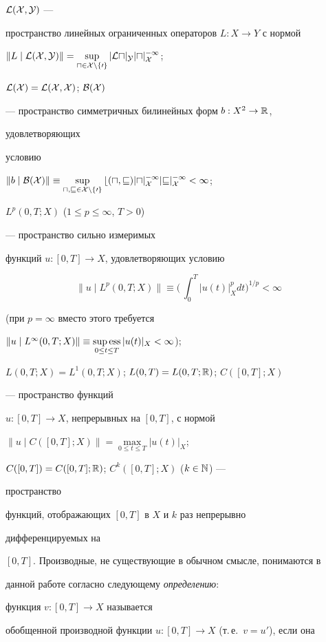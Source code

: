 $\cal L(X,Y)$ --- 


пространство линейных ограниченных операторов $L:X\to Y$ с нормой 


$\|L\mid\cal L(X,Y)\|= 


\sup\limits_{u\in X\setminus\{0\}}|Lu|_Y|u|^{-1}_X$; 


$\cal L(X)=\cal L(X,X)$; $\cal B(X)$ 


--- пространство симметричных билинейных форм $b:X^2\to\Bbb R$, 


удовлетворяющих 


условию 


$\|b\mid\cal B(X)\|\equiv 


\sup\limits_{u,v\in X\setminus\{0\}}b(u,v)|u|^{-1}_X|v|^{-1}_X<\infty$; 


$L^p(0,T;X)$ ($1\le p\le\infty$, $T>0$) 


--- пространство сильно измеримых 


функций $u:[0,T]\to X$, удовлетворяющих условию 


$$ 


\|u\mid L^p(0,T;X)\|\equiv\biggl(\,\int^T_0|u(t)|^p_X dt 


\biggr)^{1/p}<\infty 


$$ 


(при $p=\infty$ вместо этого требуется 


$\|u\mid L^\infty(0,T;X)\|\equiv 


\supess\limits_{0\le t\le T}|u(t)|_X<\infty$); 


$L(0,T;X)=L^1(0,T;X)$; $L(0,T)=L(0,T;\Bbb R)$; $C([0,T];X)$ 


--- пространство функций 


$u:[0,T]\to X$, непрерывных на $[0,T]$, с нормой 


$\|u\mid C([0,T];X)\|=\max\limits_{0\le t\le T}|u(t)|_X$; 


$C([0,T])=C([0,T];\Bbb R)$; $C^k([0,T];X)$ ($k\in\Bbb N$) --- 


пространство 


функций, отображающих $[0,T]$ в $X$ и $k$ раз непрерывно 


дифференцируемых на 


$[0,T]$. Производные, не существующие в обычном смысле, понимаются в 


данной работе согласно следующему {\it определению}:


функция $v:[0,T]\to X$ называется 


обобщенной производной функции $u:[0,T]\to X$ (т.\,е.~$v=u'$), если она 


